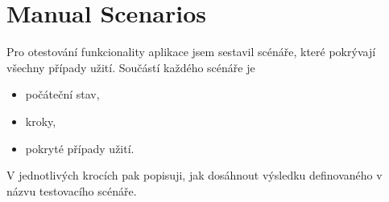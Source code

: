 \section{Manual Scenarios}
Pro otestování funkcionality aplikace jsem sestavil scénáře, které pokrývají všechny případy užití.
Součástí každého scénáře je
\begin{itemize}
    \item počáteční stav,
    \item kroky,
    \item pokryté případy užití.
\end{itemize}

V jednotlivých krocích pak popisuji, jak dosáhnout výsledku definovaného v názvu testovacího scénáře.



